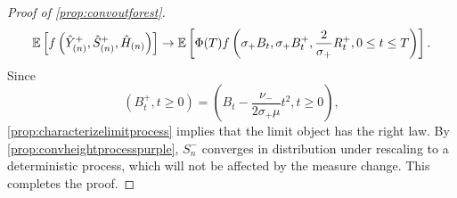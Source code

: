 \begin{proof}[Proof of \cref{prop:convoutforest}]
\begin{align*}
    {\mathbb E}\left[f\left(\hat{Y}^+_{(n)},\hat{S}^+_{(n)},  \hat{H}_{(n)}\right) \right]
    \to {\mathbb E}\left[\Phi(T)f\left(\sigma_+ B_t,\sigma_+ B^+_t,\frac{2}{\sigma_+}R^+_t,0\leq t \leq T\right)\right].
\end{align*}
Since $$(B^+_t,t\geq 0)=\left(B_t-\frac{\nu_-}{2\sigma_+ \mu}t^2,t\geq 0\right),$$
 \cref{prop:characterizelimitprocess} implies that the limit object has the right law. By \cref{prop:convheightprocesspurple}, $S^{-}_n$ converges in distribution under rescaling to a deterministic process, which will not be affected by the measure change. This completes the proof. 
\end{proof}


